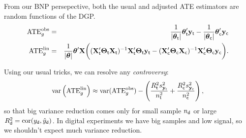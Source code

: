 \documentclass[11pt,xcolor=svgnames]{beamer}
\newcommand{\theme}{\color{DarkBlue}}
\newcommand{\gr}{\color{black!50}}
\newcommand{\bs}[1]{\boldsymbol{#1}}
\newcommand{\mr}[1]{\mathrm{#1}}
\newcommand{\bm}[1]{\mathbf{#1}}
\begin{document}
\begin{frame}

From our BNP persepective, both the usual and adjusted ATE estimators are random functions of the DGP.
\begin{eqnarray*}
\text{ATE}^\text{obs}_g &=& 
\frac{1}{|\bs{\theta}_{\sf t}|}\bs{\theta}_{\sf t}'\bm{y}_{\sf t} - \frac{1}{|\bs{\theta}_{\sf c}|}\bs{\theta}_{\sf c}'\bm{y}_{\sf c}
\\
\text{ATE}^\text{lin}_g &=& \frac{1}{|\bs{\theta}|}\bs{\theta}'\bm{X}\bigg( (\bm{X}_{\sf t}'\bs{\Theta}_{\sf t}\bm{X}_{\sf t})^{-1}  \bm{X}_{\sf t}'\bs{\Theta}_{\sf t}\bm{y}_{\sf t} - (\bm{X}_{\sf c}'\bs{\Theta}_{\sf c}\bm{X}_{\sf c})^{-1}  \bm{X}_{\sf c}'\bs{\Theta}_{\sf c}\bm{y}_{\sf c}\bigg).
\end{eqnarray*}

Using our usual tricks, we can resolve any \textit{controversy}:
\[
\mr{var}\left(\text{ATE}^\text{lin}_g\right) \approx \mr{var}(\text{ATE}^\text{obs}_g) - \left( \frac{R^2_{\sf t}s^2_{\bm{y}_{\sf t}}}{n^2_{\sf t}} +  
\frac{R^2_{\sf c}s^2_{\bm{y}_{\sf c}}}{n^2_{\sf c}} \right),
\]
so that big variance reduction comes only for small sample $n_{\sf d}$ or large $R_{\sf d}^2 = \mr{cor}(y_{\sf d},\hat y_{\sf d})$.  {\theme In digital experiments we have big samples and low signal, so we shouldn't expect much variance reduction.}

\end{frame}

\end{document}
